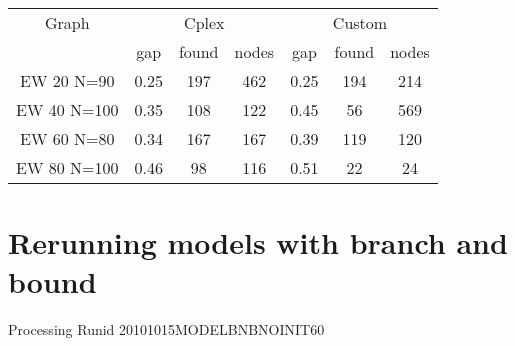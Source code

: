\documentclass[landscape, 12pt]{report}
\begin{document}
 \begin{tabular}{|c|ccc|ccc|}
\hline
\multicolumn{1}{|c|}{Graph} & \multicolumn{3}{|c|}{Cplex} & \multicolumn{3}{|c|}{Custom}
\\
 & gap & found & nodes & gap & found & nodes 
\\
\hline
EW 20 N=90 & 0.25 & 197 & 462 & 0.25 & 194 & 214
\\
EW 40 N=100 & 0.35 & 108 & 122 & 0.45 & 56 & 569
\\
EW 60 N=80 & 0.34 & 167 & 167 & 0.39 & 119 & 120 
\\
EW 80 N=100 & 0.46 & 98 & 116 & 0.51 & 22 & 24
\\
\hline 
 \end{tabular}


\clearpage

\section{Rerunning models with branch and bound}

Processing Runid 20101015MODELBNBNOINIT60
 
\end{document}
